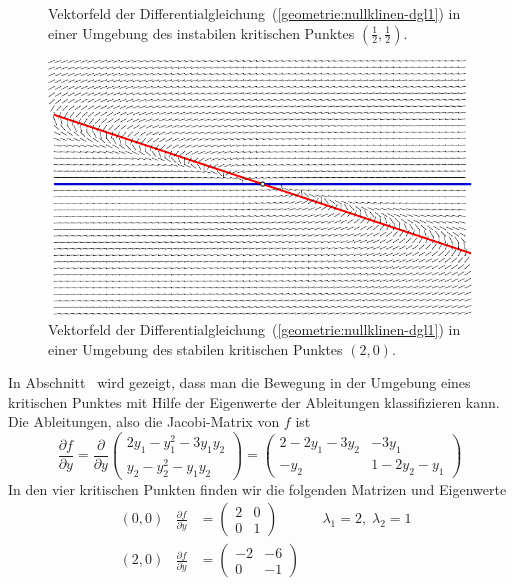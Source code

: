 \begin{beispiel}
\begin{figure}
\caption{Vektorfeld der Differentialgleichung~(\ref{geometrie:nullklinen-dgl1})
in einer Umgebung des instabilen kritischen Punktes $(\frac12,\frac12)$.
\label{geometrie:nullklinen-instabil}}
\end{figure}
\begin{figure}
\centering
\includegraphics{chapters/images/nullklinen-4.pdf}
\caption{Vektorfeld der Differentialgleichung~(\ref{geometrie:nullklinen-dgl1})
in einer Umgebung des stabilen kritischen Punktes $(2,0)$.
\label{geometrie:nullklinen-stabil}}
\end{figure}
In Abschnitt~\label{geometrie:umgebung-kritisch} wird gezeigt, dass man 
die Bewegung in der Umgebung eines kritischen Punktes mit Hilfe der
Eigenwerte der Ableitungen klassifizieren kann.
Die Ableitungen, also die Jacobi-Matrix von $f$ ist
\[
\frac{\partial f}{\partial y}
=
\frac{\partial}{\partial y}
\begin{pmatrix}
2y_1-y_1^2-3y_1y_2\\
y_2-y_2^2-y_1y_2
\end{pmatrix}
=
\begin{pmatrix}
2-2y_1-3y_2 & -3y_1\\
-y_2        &1-2y_2-y_1
\end{pmatrix}
\]
In den vier kritischen Punkten finden wir die folgenden Matrizen und
Eigenwerte
\begin{align*}
&(0,0)
	&\frac{\partial f}{\partial y}&=\begin{pmatrix}2&0\\0&1\end{pmatrix}
		&&\lambda_1=2,\;\lambda_2=1\\
&(2,0)
	&\frac{\partial f}{\partial y}&=\begin{pmatrix}-2&-6\\0&-1\end{pmatrix}

\end{align*}
\end{beispiel}
